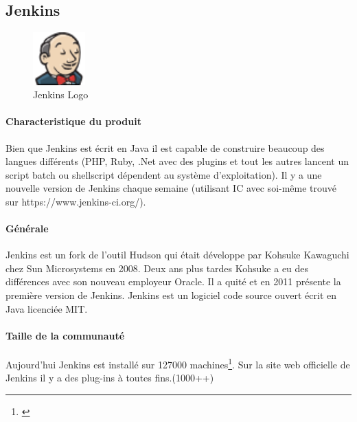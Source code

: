 \newpage




\subsection{Jenkins}
\begin{figure}
  \begin{center}
    \includegraphics[width=0.18\textwidth]{bilder/JENKINS}
  \end{center}
  \caption{Jenkins Logo}
\end{figure}
\paragraph{Characteristique du produit} Bien que Jenkins est écrit en Java il est capable de construire beaucoup des langues différents (PHP, Ruby, .Net avec des plugins et tout les autres lancent un script batch ou shellscript dépendent au système d'exploitation). Il y a une nouvelle version de Jenkins chaque semaine (utilisant IC avec soi-même trouvé sur https://www.jenkins-ci.org/).

\paragraph{Générale} Jenkins est un fork de l'outil Hudson qui était développe par Kohsuke Kawaguchi chez Sun Microsystems en 2008. Deux ans plus tardes Kohsuke a eu des différences avec son nouveau employeur Oracle. Il a quité et en 2011 présente la première version de Jenkins. Jenkins est un logiciel code source ouvert écrit en Java licenciée MIT. 
\paragraph{Taille de la communauté} Aujourd'hui Jenkins est installé sur 127000 machines\footnote{\citep{jenkinsstats}}. Sur la site web officielle de Jenkins il y a des plug-ins à toutes fins.(1000++) 

